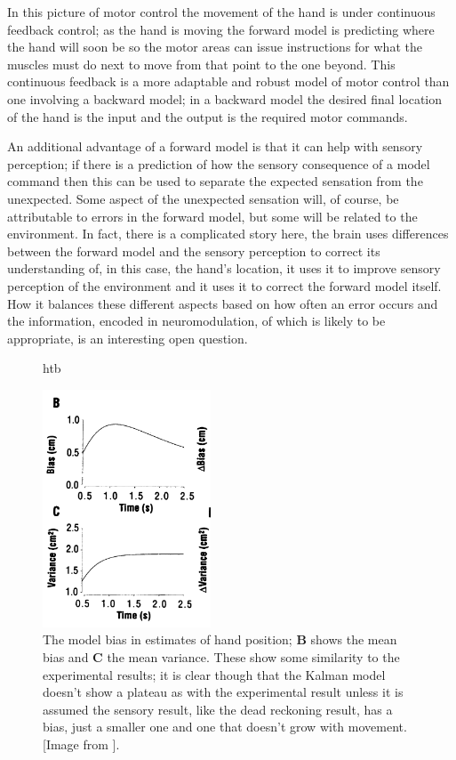 \documentclass[12pt]{article}
\begin{document}
In this picture of motor control the movement of the hand is under
continuous feedback control; as the hand is moving the forward model
is predicting where the hand will soon be so the motor areas can issue
instructions for what the muscles must do next to move from that point
to the one beyond. This continuous feedback is a more adaptable and
robust model of motor control than one involving a backward model; in
a backward model the desired final location of the hand is the input
and the output is the required motor commands. 

An additional advantage of a forward model is that it can help with
sensory perception; if there is a prediction of how the sensory
consequence of a model command then this can be used to separate the
expected sensation from the unexpected. Some aspect of the unexpected
sensation will, of course, be attributable to errors in the forward
model, but some will be related to the environment. In fact, there is
a complicated story here, the brain uses differences between the
forward model and the sensory perception to correct its understanding
of, in this case, the hand's location, it uses it to improve sensory
perception of the environment and it uses it to correct the forward
model itself. How it balances these different aspects based on how
often an error occurs and the information, encoded in neuromodulation,
of which is likely to be appropriate, is an interesting open question.


\begin{figure}{htb}
\begin{center}
  \includegraphics[width=5cm]{fig_model.png}
\end{center}
\caption{The model bias in estimates of hand position; \textbf{B}
  shows the mean bias and \textbf{C} the mean variance. These show
  some similarity to the experimental results; it is clear though that
  the Kalman model doesn't show a plateau as with the experimental
  result unless it is assumed the sensory result, like the dead
  reckoning result, has a bias, just a smaller one and one that
  doesn't grow with movement. [Image from
    \cite{WolpertEtAl1995}].\label{fig_model}}
\end{figure}
\end{document}
